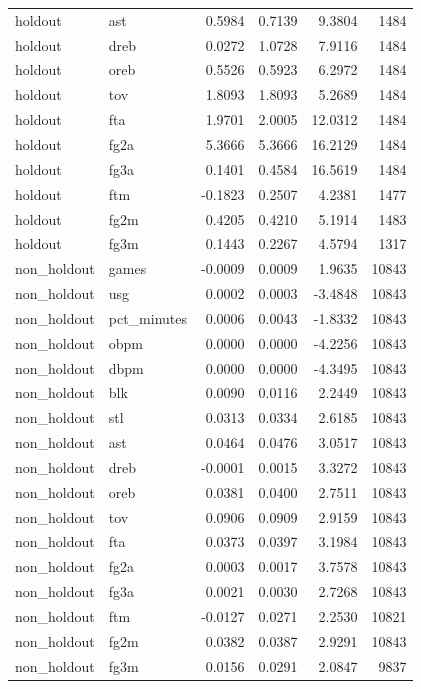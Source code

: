 \begin{table}
\begin{tabular}{llrrrr}
holdout & ast & 0.5984 & 0.7139 & 9.3804 & 1484 \\
holdout & dreb & 0.0272 & 1.0728 & 7.9116 & 1484 \\
holdout & oreb & 0.5526 & 0.5923 & 6.2972 & 1484 \\
holdout & tov & 1.8093 & 1.8093 & 5.2689 & 1484 \\
holdout & fta & 1.9701 & 2.0005 & 12.0312 & 1484 \\
holdout & fg2a & 5.3666 & 5.3666 & 16.2129 & 1484 \\
holdout & fg3a & 0.1401 & 0.4584 & 16.5619 & 1484 \\
holdout & ftm & -0.1823 & 0.2507 & 4.2381 & 1477 \\
holdout & fg2m & 0.4205 & 0.4210 & 5.1914 & 1483 \\
holdout & fg3m & 0.1443 & 0.2267 & 4.5794 & 1317 \\
non\_holdout & games & -0.0009 & 0.0009 & 1.9635 & 10843 \\
non\_holdout & usg & 0.0002 & 0.0003 & -3.4848 & 10843 \\
non\_holdout & pct\_minutes & 0.0006 & 0.0043 & -1.8332 & 10843 \\
non\_holdout & obpm & 0.0000 & 0.0000 & -4.2256 & 10843 \\
non\_holdout & dbpm & 0.0000 & 0.0000 & -4.3495 & 10843 \\
non\_holdout & blk & 0.0090 & 0.0116 & 2.2449 & 10843 \\
non\_holdout & stl & 0.0313 & 0.0334 & 2.6185 & 10843 \\
non\_holdout & ast & 0.0464 & 0.0476 & 3.0517 & 10843 \\
non\_holdout & dreb & -0.0001 & 0.0015 & 3.3272 & 10843 \\
non\_holdout & oreb & 0.0381 & 0.0400 & 2.7511 & 10843 \\
non\_holdout & tov & 0.0906 & 0.0909 & 2.9159 & 10843 \\
non\_holdout & fta & 0.0373 & 0.0397 & 3.1984 & 10843 \\
non\_holdout & fg2a & 0.0003 & 0.0017 & 3.7578 & 10843 \\
non\_holdout & fg3a & 0.0021 & 0.0030 & 2.7268 & 10843 \\
non\_holdout & ftm & -0.0127 & 0.0271 & 2.2530 & 10821 \\
non\_holdout & fg2m & 0.0382 & 0.0387 & 2.9291 & 10843 \\
non\_holdout & fg3m & 0.0156 & 0.0291 & 2.0847 & 9837 \\
\bottomrule
\end{tabular}
\end{table}
